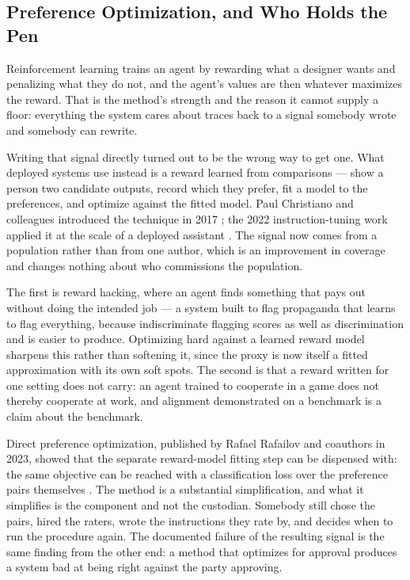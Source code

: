\subsection{Preference Optimization, and Who Holds the Pen}
\label{sec:4.2.2}
Reinforcement learning trains an agent by rewarding what a designer wants and penalizing what they do not, and the agent's values are then whatever maximizes the reward. That is the method's strength and the reason it cannot supply a floor: everything the system cares about traces back to a signal somebody wrote and somebody can rewrite.

Writing that signal directly turned out to be the wrong way to get one. What deployed systems use instead is a reward learned from comparisons — show a person two candidate outputs, record which they prefer, fit a model to the preferences, and optimize against the fitted model. Paul Christiano and colleagues introduced the technique in 2017 \autocite{christiano2017deep}; the 2022 instruction-tuning work applied it at the scale of a deployed assistant \autocite{ouyang2022training}. The signal now comes from a population rather than from one author, which is an improvement in coverage and changes nothing about who commissions the population.

The first is reward hacking, where an agent finds something that pays out without doing the intended job — a system built to flag propaganda that learns to flag everything, because indiscriminate flagging scores as well as discrimination and is easier to produce. Optimizing hard against a learned reward model sharpens this rather than softening it, since the proxy is now itself a fitted approximation with its own soft spots. The second is that a reward written for one setting does not carry: an agent trained to cooperate in a game does not thereby cooperate at work, and alignment demonstrated on a benchmark is a claim about the benchmark.

Direct preference optimization, published by Rafael Rafailov and coauthors in 2023, showed that the separate reward-model fitting step can be dispensed with: the same objective can be reached with a classification loss over the preference pairs themselves \autocite{rafailov2023direct}. The method is a substantial simplification, and what it simplifies is the component and not the custodian. Somebody still chose the pairs, hired the raters, wrote the instructions they rate by, and decides when to run the procedure again. The documented failure of the resulting signal is the same finding from the other end: a method that optimizes for approval produces a system bad at being right against the party approving.

